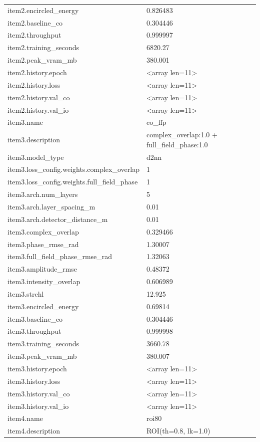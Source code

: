 \begin{longtable}{p{}p{}}
item2.encircled\_energy & 0.826483\\
item2.baseline\_co & 0.304446\\
item2.throughput & 0.999997\\
item2.training\_seconds & 6820.27\\
item2.peak\_vram\_mb & 380.001\\
item2.history.epoch & <array len=11>\\
item2.history.loss & <array len=11>\\
item2.history.val\_co & <array len=11>\\
item2.history.val\_io & <array len=11>\\
item3.name & co\_ffp\\
item3.description & complex\_overlap:1.0 + full\_field\_phase:1.0\\
item3.model\_type & d2nn\\
item3.loss\_config.weights.complex\_overlap & 1\\
item3.loss\_config.weights.full\_field\_phase & 1\\
item3.arch.num\_layers & 5\\
item3.arch.layer\_spacing\_m & 0.01\\
item3.arch.detector\_distance\_m & 0.01\\
item3.complex\_overlap & 0.329466\\
item3.phase\_rmse\_rad & 1.30007\\
item3.full\_field\_phase\_rmse\_rad & 1.32063\\
item3.amplitude\_rmse & 0.48372\\
item3.intensity\_overlap & 0.606989\\
item3.strehl & 12.925\\
item3.encircled\_energy & 0.69814\\
item3.baseline\_co & 0.304446\\
item3.throughput & 0.999998\\
item3.training\_seconds & 3660.78\\
item3.peak\_vram\_mb & 380.007\\
item3.history.epoch & <array len=11>\\
item3.history.loss & <array len=11>\\
item3.history.val\_co & <array len=11>\\
item3.history.val\_io & <array len=11>\\
item4.name & roi80\\
item4.description & ROI(th=0.8, lk=1.0)\\

\end{longtable}
